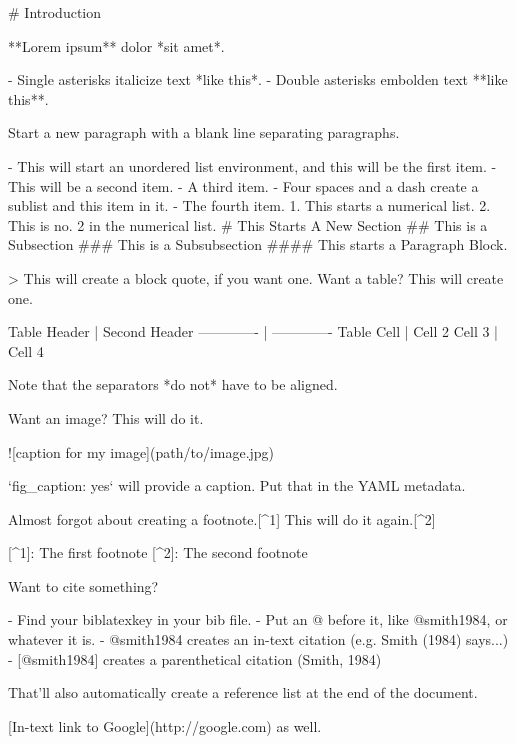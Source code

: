 \documentclass[11pt,]{article}
\newenvironment{Shaded}{\begin{snugshade}}{\end{snugshade}}
\newcommand{\AlertTok}[1]{\textcolor[rgb]{0.94,0.16,0.16}{#1}}
\newcommand{\BaseNTok}[1]{\textcolor[rgb]{0.00,0.00,0.81}{#1}}
\newcommand{\DataTypeTok}[1]{\textcolor[rgb]{0.13,0.29,0.53}{#1}}
\newcommand{\FloatTok}[1]{\textcolor[rgb]{0.00,0.00,0.81}{#1}}
\newcommand{\FunctionTok}[1]{\textcolor[rgb]{0.00,0.00,0.00}{#1}}
\newcommand{\NormalTok}[1]{#1}
\newcommand{\OtherTok}[1]{\textcolor[rgb]{0.56,0.35,0.01}{#1}}
\begin{document}
\begin{Shaded}
\begin{Highlighting}[]

\FunctionTok{# Introduction}

\NormalTok{**Lorem ipsum** dolor *sit amet*. }

\NormalTok{- }\FloatTok{Single asterisks italicize text *like this*. }
\FloatTok{- Double asterisks embolden text **like this**.}

\NormalTok{Start a new paragraph with a blank line separating paragraphs.}

\NormalTok{- }\FloatTok{This will start an unordered list environment, and this will be the first item.}
\FloatTok{- This will be a second item.}
\FloatTok{- A third item.}
\FloatTok{    - Four spaces and a dash create a sublist and this item in it.}
\FloatTok{- The fourth item.}
\FloatTok{    }
\FloatTok{1. This starts a numerical list.}
\FloatTok{2. This is no. 2 in the numerical list.}
\FloatTok{    }
\FloatTok{# This Starts A New Section}
\FloatTok{## This is a Subsection}
\FloatTok{### This is a Subsubsection}
\FloatTok{#### This starts a Paragraph Block.}

\NormalTok{>}\DataTypeTok{ This will create a block quote, if you want one.}
\DataTypeTok{Want a table? This will create one.}

\NormalTok{Table Header  | Second Header}
\NormalTok{------------- | -------------}
\NormalTok{Table Cell    | Cell 2}
\NormalTok{Cell 3        | Cell 4 }

\NormalTok{Note that the separators *do not* have to be aligned.}

\NormalTok{Want an image? This will do it.}

\AlertTok{![caption for my image](path/to/image.jpg)}

\BaseNTok{`fig_caption: yes`}\NormalTok{ will provide a caption. Put that in the YAML metadata.}

\NormalTok{Almost forgot about creating a footnote.}\OtherTok{[^1]}\NormalTok{ This will do it again.}\OtherTok{[^2]}

\OtherTok{[^1]}\NormalTok{: The first footnote}
\OtherTok{[^2]}\NormalTok{: The second footnote}

\NormalTok{Want to cite something? }

\NormalTok{- }\FloatTok{Find your biblatexkey in your bib file.}
\FloatTok{- Put an @ before it, like @smith1984, or whatever it is.}
\FloatTok{- @smith1984 creates an in-text citation (e.g. Smith (1984) says...)}
\FloatTok{- [@smith1984] creates a parenthetical citation (Smith, 1984)}

\NormalTok{That'll also automatically create a reference list at the end of the document.}

\OtherTok{[In-text link to Google](http://google.com)}\NormalTok{ as well.}
\end{Highlighting}
\end{Shaded}
\end{document}
